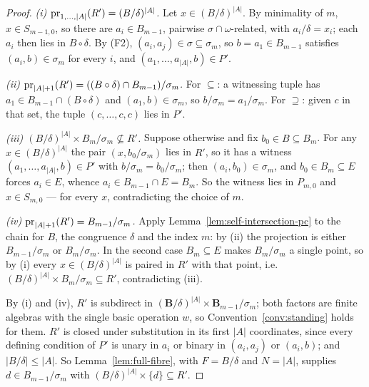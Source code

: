 \begin{proof}
\emph{(i) $\operatorname*{pr}_{1,\dots,|A|}(R')=(B/\delta)^{|A|}$.} Let
$x\in(B/\delta)^{|A|}$. By minimality of $m$, $x\in S_{m-1,0}$, so there are
$a_{i}\in B_{m-1}$, pairwise $\sigma\cap\omega$-related, with
$a_{i}/\delta=x_{i}$; each $a_{i}$ then lies in $B\circ\delta$. By (F2),
$(a_{i},a_{j})\in\sigma\subseteq\sigma_{m}$, so $b=a_{1}\in B_{m-1}$ satisfies
$(a_{i},b)\in\sigma_{m}$ for every $i$, and $(a_{1},\dots,a_{|A|},b)\in P'$.

\emph{(ii) $\operatorname*{pr}_{|A|+1}(R')=((B\circ\delta)\cap B_{m-1})/\sigma_{m}$.} For
$\subseteq$: a witnessing tuple has $a_{1}\in B_{m-1}\cap(B\circ\delta)$ and
$(a_{1},b)\in\sigma_{m}$, so $b/\sigma_{m}=a_{1}/\sigma_{m}$. For
$\supseteq$: given $c$ in that set, the tuple $(c,\dots,c,c)$ lies in $P'$.

\emph{(iii) $(B/\delta)^{|A|}\times B_{m}/\sigma_{m}\not\subseteq R'$.} Suppose
otherwise and fix $b_{0}\in B\subseteq B_{m}$. For any
$x\in(B/\delta)^{|A|}$ the pair $(x,b_{0}/\sigma_{m})$ lies in $R'$, so it has
a witness $(a_{1},\dots,a_{|A|},b)\in P'$ with $b/\sigma_{m}=b_{0}/\sigma_{m}$;
then $(a_{i},b_{0})\in\sigma_{m}$, and $b_{0}\in B_{m}\subseteq E$ forces
$a_{i}\in E$, whence $a_{i}\in B_{m-1}\cap E=B_{m}$. So the witness lies in
$P_{m,0}$ and $x\in S_{m,0}$ --- for every $x$, contradicting the choice of
$m$.

\emph{(iv) $\operatorname*{pr}_{|A|+1}(R')=B_{m-1}/\sigma_{m}$.} Apply
Lemma~\ref{lem:self-intersection-pc} to the chain for $B$, the congruence
$\delta$ and the index $m$: by (ii) the projection is either
$B_{m-1}/\sigma_{m}$ or $B_{m}/\sigma_{m}$. In the second case
$B_{m}\subseteq E$ makes $B_{m}/\sigma_{m}$ a single point, so by (i) every
$x\in(B/\delta)^{|A|}$ is paired in $R'$ with that point, i.e.\
$(B/\delta)^{|A|}\times B_{m}/\sigma_{m}\subseteq R'$, contradicting (iii).

By (i) and (iv), $R'$ is subdirect in $(\mathbf B/\delta)^{|A|}\times
\mathbf B_{m-1}/\sigma_{m}$; both factors are finite algebras with the single
basic operation $w$, so Convention~\ref{conv:standing} holds for them. $R'$ is
closed under substitution in its first $|A|$ coordinates, since every defining
condition of $P'$ is unary in $a_{i}$ or binary in $(a_{i},a_{j})$ or
$(a_{i},b)$; and $|B/\delta|\le|A|$. So Lemma~\ref{lem:full-fibre}, with
$F=B/\delta$ and $N=|A|$, supplies $d\in B_{m-1}/\sigma_{m}$ with
$(B/\delta)^{|A|}\times\{d\}\subseteq R'$.


\end{proof}
